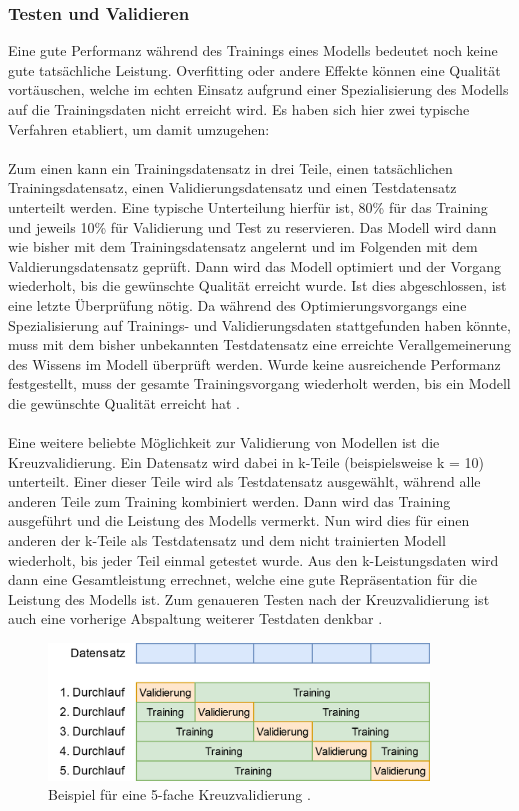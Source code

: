 \documentclass[11pt,bibliography=totocnumbered]{scrartcl}
\begin{document}
\subsubsection{Testen und Validieren}
\label{validation}
Eine gute Performanz während des Trainings eines Modells bedeutet noch keine gute tatsächliche Leistung. Overfitting oder andere Effekte können eine Qualität vortäuschen, welche im echten Einsatz aufgrund einer Spezialisierung des Modells auf die Trainingsdaten nicht erreicht wird. Es haben sich hier zwei typische Verfahren etabliert, um damit umzugehen:
\\\\
Zum einen kann ein Trainingsdatensatz in drei Teile, einen tatsächlichen Trainingsdatensatz, einen Validierungsdatensatz und einen Testdatensatz unterteilt werden. Eine typische Unterteilung hierfür ist, 80\% für das Training und jeweils 10\% für Validierung und Test zu reservieren. Das Modell wird dann wie bisher mit dem Trainingsdatensatz angelernt und im Folgenden mit dem Valdierungsdatensatz geprüft. Dann wird das Modell optimiert und der Vorgang wiederholt, bis die gewünschte Qualität erreicht wurde. Ist dies  abgeschlossen, ist eine letzte Überprüfung nötig. Da während des Optimierungsvorgangs eine Spezialisierung auf Trainings- und Validierungsdaten stattgefunden haben könnte, muss mit dem bisher unbekannten Testdatensatz eine erreichte Verallgemeinerung des Wissens im Modell überprüft werden. Wurde keine ausreichende Performanz festgestellt, muss der gesamte Trainingsvorgang wiederholt werden, bis ein Modell die gewünschte Qualität erreicht hat \cite[S.30-31]{MACHINE_LEARNING}\cite[S.43-44]{BA}.
\\\\
Eine weitere beliebte Möglichkeit zur Validierung von Modellen ist die Kreuzvalidierung. Ein Datensatz wird dabei in k-Teile (beispielsweise k = 10) unterteilt. Einer dieser Teile wird als Testdatensatz ausgewählt, während alle anderen Teile zum Training kombiniert werden. Dann wird das Training ausgeführt und die Leistung des Modells vermerkt. Nun wird dies für einen anderen der k-Teile als Testdatensatz und dem nicht trainierten Modell wiederholt, bis jeder Teil einmal getestet wurde. Aus den k-Leistungsdaten wird dann eine Gesamtleistung errechnet, welche eine gute Repräsentation für die Leistung des Modells ist. Zum genaueren Testen nach der Kreuzvalidierung ist auch eine vorherige Abspaltung weiterer Testdaten denkbar \cite[S.22]{DEEP_LEARNING}\cite[S.44]{BA}.
\begin{figure}[H]
	\centering
	\includegraphics[width=0.90\textwidth]{kreuzvalidierung}
	\vspace*{-3mm}
	\caption[Beispiel für Kreuzvalidierung]{Beispiel für eine 5-fache Kreuzvalidierung \cite[S.44]{BA}.}
	\label{fig:crossvalidation}
\end{figure}
\end{document}
